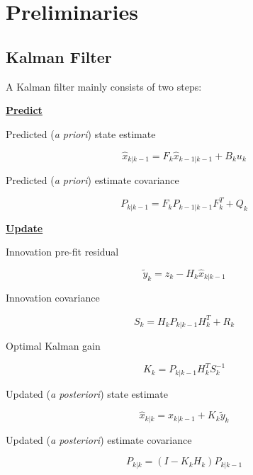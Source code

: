 \section{Preliminaries}

\subsection{Kalman Filter}

A Kalman filter mainly consists of two steps:

\underline{\bf \large Predict}

Predicted ({\it a priori}) state estimate

\begin{equation*}
    \hat{x}_{k|k-1} = F_k \hat{x}_{k-1|k-1} + B_k u_k
\end{equation*}

Predicted ({\it a priori}) estimate covariance

\begin{equation*}
    P_{k|k-1} = F_k P_{k-1|k-1} F_k^T + Q_k
\end{equation*}

\underline{\bf \large Update} 

Innovation pre-fit residual 

\begin{equation*}
    \tilde{y}_k = z_k - H_k \hat{x}_{k|k-1}
\end{equation*}

Innovation covariance 

\begin{equation*}
    S_k = H_k P_{k|k-1}H_k^T + R_k
\end{equation*}

Optimal Kalman gain 

\begin{equation*}
    K_k = P_{k|k-1}H_k^TS_k^{-1}
\end{equation*}

Updated ({\it a posteriori}) state estimate 

\begin{equation*}
    \hat{x}_{k|k} = \hat{x}_{k|k-1} + K_k \tilde{y}_k
\end{equation*}

Updated ({\it a posteriori}) estimate covariance

\begin{equation*}
    P_{k|k} = (I - K_k H_k)P_{k|k-1}
\end{equation*}

